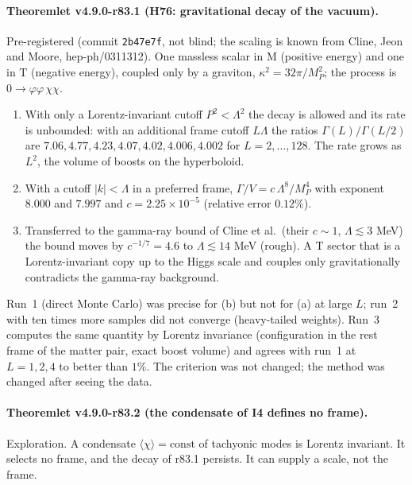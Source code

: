 \paragraph{Theoremlet v4.9.0-r83.1 (H76: gravitational decay of the vacuum).}
Pre-registered (commit \texttt{2b47e7f}, not blind; the scaling is known from Cline, Jeon and Moore, hep-ph/0311312).  One massless
scalar in M (positive energy) and one in T (negative energy), coupled only by a graviton, \(\kappa^2=32\pi/M_P^2\); the process is
\(0\to\varphi\varphi\,\chi\chi\).
\begin{enumerate}[leftmargin=2em]
\item[(a)] With only a Lorentz-invariant cutoff \(P^2<\Lambda^2\) the decay is allowed and its rate is unbounded: with an additional frame
cutoff \(L\Lambda\) the ratios \(\Gamma(L)/\Gamma(L/2)\) are \(7.06,4.77,4.23,4.07,4.02,4.006,4.002\) for \(L=2,\dots,128\).  The rate grows as
\(L^2\), the volume of boosts on the hyperboloid.
\item[(b)] With a cutoff \(|k|<\Lambda\) in a preferred frame, \(\Gamma/V=c\,\Lambda^8/M_P^4\) with exponent \(8.000\) and \(7.997\) and
\(c=2.25\times10^{-5}\) (relative error \(0.12\%\)).
\item[(c)] Transferred to the gamma-ray bound of Cline et al.\ (their \(c\sim1\), \(\Lambda\lesssim3\) MeV) the bound moves by
\(c^{-1/7}=4.6\) to \(\Lambda\lesssim14\) MeV (rough).  A T sector that is a Lorentz-invariant copy up to the Higgs scale and couples only
gravitationally contradicts the gamma-ray background.
\end{enumerate}
Run~1 (direct Monte Carlo) was precise for (b) but not for (a) at large \(L\); run~2 with ten times more samples did not converge
(heavy-tailed weights).  Run~3 computes the same quantity by Lorentz invariance (configuration in the rest frame of the matter pair,
exact boost volume) and agrees with run~1 at \(L=1,2,4\) to better than \(1\%\).  The criterion was not changed; the method was changed
after seeing the data.

\paragraph{Theoremlet v4.9.0-r83.2 (the condensate of I4 defines no frame).}
Exploration.  A condensate \(\langle\chi\rangle=\text{const}\) of tachyonic modes is Lorentz invariant.  It selects no frame, and the
decay of r83.1 persists.  It can supply a scale, not the frame.

